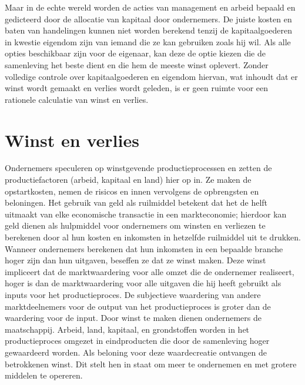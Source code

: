\documentclass[
  a5paper,
  smalldemyvopaper,11pt,twoside,onecolumn,openright,extrafontsizes,
hidelinks]{memoir}
\begin{document}
Maar in de echte wereld worden de acties van management en arbeid
bepaald en gedicteerd door de allocatie van kapitaal door ondernemers.
De juiste kosten en baten van handelingen kunnen niet worden berekend
tenzij de kapitaalgoederen in kwestie eigendom zijn van iemand die ze
kan gebruiken zoals hij wil. Als alle opties beschikbaar zijn voor de
eigenaar, kan deze de optie kiezen die de samenleving het beste dient en
die hem de meeste winst oplevert. Zonder volledige controle over
kapitaalgoederen en eigendom hiervan, wat inhoudt dat er winst wordt
gemaakt en verlies wordt geleden, is er geen ruimte voor een rationele
calculatie van winst en verlies.

\section{Winst en verlies}\label{winst-en-verlies}

Ondernemers speculeren op winstgevende productieprocessen en zetten de
productiefactoren (arbeid, kapitaal en land) hier op in. Ze maken de
opstartkosten, nemen de risicos en innen vervolgens de opbrengsten en
beloningen. Het gebruik van geld als ruilmiddel betekent dat het de
helft uitmaakt van elke economische transactie in een markteconomie;
hierdoor kan geld dienen als hulpmiddel voor ondernemers om winsten en
verliezen te berekenen door al hun kosten en inkomsten in hetzelfde
ruilmiddel uit te drukken. Wanneer ondernemers berekenen dat hun
inkomsten in een bepaalde branche hoger zijn dan hun uitgaven, beseffen
ze dat ze winst maken. Deze winst impliceert dat de marktwaardering voor
alle omzet die de ondernemer realiseert, hoger is dan de marktwaardering
voor alle uitgaven die hij heeft gebruikt als inputs voor het
productieproces. De subjectieve waardering van andere marktdeelnemers
voor de output van het productieproces is groter dan de waardering voor
de input. Door winst te maken dienen ondernemers de maatschappij.
Arbeid, land, kapitaal, en grondstoffen worden in het productieproces
omgezet in eindproducten die door de samenleving hoger gewaardeerd
worden. Als beloning voor deze waardecreatie ontvangen de betrokkenen
winst. Dit stelt hen in staat om meer te ondernemen en met grotere
middelen te opereren.
\end{document}

